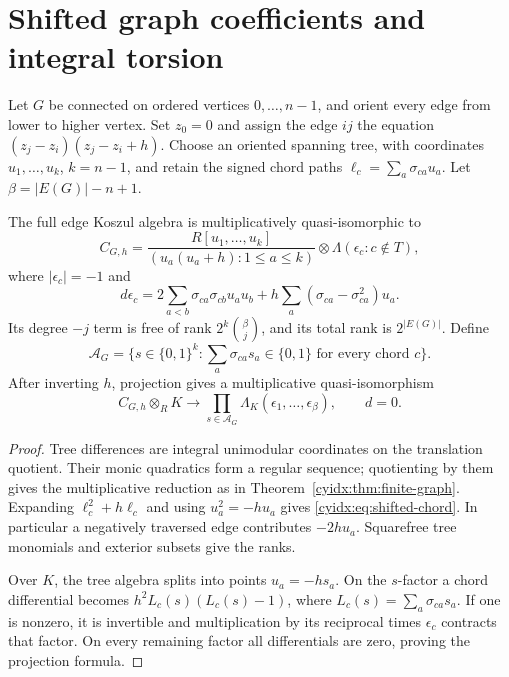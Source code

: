 \section{Shifted graph coefficients and integral torsion}
\label{cyidx:sec:shifted-graphs}

Let \(G\) be connected on ordered vertices
\(0,\ldots,n-1\), and orient every edge from lower
to higher vertex. Set \(z_0=0\) and assign the edge
\(ij\) the equation
\((z_j-z_i)(z_j-z_i+h)\).
Choose an oriented spanning tree, with coordinates
\(u_1,\ldots,u_k\), \(k=n-1\), and retain the
signed chord paths \(\ell_c=\sum_a\sigma_{ca}u_a\).
Let \(\beta=|E(G)|-n+1\).

\begin{theorem}\label{cyidx:thm:shifted-graphs}
The full edge Koszul algebra is multiplicatively
quasi-isomorphic to
\begin{equation}\label{cyidx:eq:shifted-graph-model}
 C_{G,h}=\frac{R[u_1,\ldots,u_k]}
                     {(u_a(u_a+h):1\leq a\leq k)}
                 \otimes\Lambda(\epsilon_c:c\notin T),
\end{equation}
where \(|\epsilon_c|=-1\) and
\begin{equation}\label{cyidx:eq:shifted-chord}
 d\epsilon_c=2\sum_{a<b}\sigma_{ca}\sigma_{cb}u_au_b
                  +h\sum_a(\sigma_{ca}-\sigma_{ca}^2)u_a.
\end{equation}
Its degree \(-j\) term is free of rank
\(2^k\binom\beta j\), and its total rank is
\(2^{|E(G)|}\). Define
\[
 \mathcal A_G=\{s\in\{0,1\}^k:
                \textstyle\sum_a\sigma_{ca}s_a\in\{0,1\}
                        \text{ for every chord }c\}.
\]
After inverting \(h\), projection gives a
multiplicative quasi-isomorphism
\begin{equation}\label{cyidx:eq:graph-generic}
 C_{G,h}\otimes_R K\longrightarrow
      \prod_{s\in\mathcal A_G}
             \Lambda_K(\epsilon_1,\ldots,\epsilon_\beta),
                         \qquad d=0.
\end{equation}
\end{theorem}
\begin{proof}
Tree differences are integral unimodular coordinates
on the translation quotient. Their monic quadratics
form a regular sequence; quotienting by them gives
the multiplicative reduction as in
Theorem~\ref{cyidx:thm:finite-graph}. Expanding
\(\ell_c^2+h\ell_c\) and using \(u_a^2=-hu_a\)
gives \eqref{cyidx:eq:shifted-chord}. In particular
a negatively traversed edge contributes \(-2hu_a\).
Squarefree tree monomials and exterior subsets give
the ranks.

Over \(K\), the tree algebra splits into points
\(u_a=-hs_a\). On the \(s\)-factor a chord
differential becomes \(h^2L_c(s)(L_c(s)-1)\),
where \(L_c(s)=\sum_a\sigma_{ca}s_a\).
If one is nonzero, it is invertible and multiplication
by its reciprocal times \(\epsilon_c\) contracts
that factor. On every remaining factor all
differentials are zero, proving the projection formula.
\end{proof}

